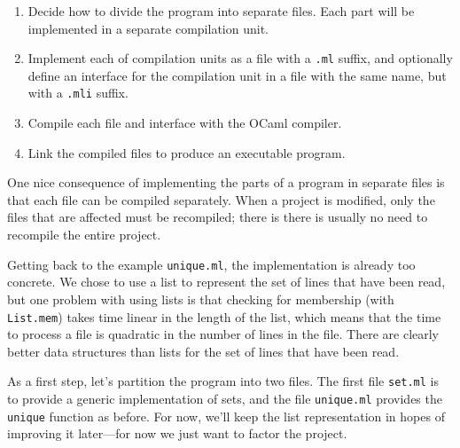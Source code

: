 \begin{enumerate}

\item{} 

Decide how to divide the program into separate files.  Each part will
be implemented in a separate compilation unit.

\item{}

  Implement each of compilation units as a file with a \hbox{\lstinline/.ml/} suffix, and optionally
  define an interface for the compilation unit in a file with the same name, but with a
  \hbox{\lstinline/.mli/} suffix.

\item{}

Compile each file and interface with the OCaml compiler.

\item{}

Link the compiled files to produce an executable program.

\end{enumerate}
%
One nice consequence of implementing the parts of a program in
separate files is that each file can be compiled separately. When a
project is modified, only the files that are affected must be
recompiled; there is there is usually no need to recompile the entire
project.

Getting back to the example \hbox{\lstinline/unique.ml/}, the
implementation is already too concrete. We chose to use a list to
represent the set of lines that have been read, but one problem with
using lists is that checking for membership
(with \hbox{\lstinline/List.mem/}) takes time linear in the length of
the list, which means that the time to process a file is quadratic in
the number of lines in the file.  There are clearly better data
structures than lists for the set of lines that have been read.

As a first step, let's partition the program into two files. The first
file \hbox{\lstinline/set.ml/} is to provide a generic implementation
of sets, and the file \hbox{\lstinline/unique.ml/} provides
the \hbox{\lstinline/unique/} function as before. For now, we'll keep
the list representation in hopes of improving it later---for now we
just want to factor the project.

